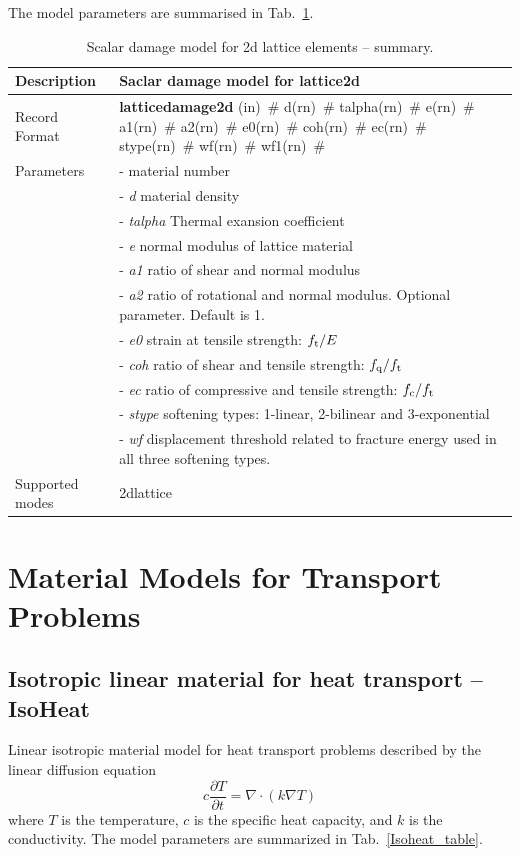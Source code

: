\documentclass[a4paper]{article}
\newcommand{\descitem}[1]{{\noindent \bf #1}}
\newcommand{\elemparam}[2]{{{#1\tiny (#2)}~\#}}
\newcommand{\param}[1]{{\it #1}}
\begin{document}
The model parameters are summarised in Tab.~\ref{latticedamage2d_table}.
\begin{table}[!htb]
\begin{tabular}{|l|p{9cm}|}
\hline
Description & Saclar damage model for lattice2d \\
\hline
Record Format & \descitem{latticedamage2d} \elemparam{}{in} 
\elemparam{d}{rn} \elemparam{talpha}{rn} \elemparam{e}{rn} \elemparam{a1}{rn} \elemparam{a2}{rn} \elemparam{e0}{rn}  \elemparam{coh}{rn} \elemparam{ec}{rn} \elemparam{stype}{rn} \elemparam{wf}{rn} \elemparam{wf1}{rn} \\
Parameters &- \param{} material number\\
&- \param{d} material density\\
&- \param{talpha} Thermal exansion coefficient\\
&- \param{e} normal modulus of lattice material\\
&- \param{a1} ratio of shear and normal modulus\\
&- \param{a2} ratio of rotational and normal modulus. Optional parameter. Default is 1.\\
&- \param{e0} strain at tensile strength: $f_{\rm t}/E$\\
&- \param{coh} ratio of shear and tensile strength: $f_{\rm q}/f_{\rm t}$\\
&- \param{ec} ratio of compressive and tensile strength: $f_{\rm c}/f_{\rm t}$\\
&- \param{stype} softening types: 1-linear, 2-bilinear and 3-exponential\\
&- \param{wf} displacement threshold related to fracture energy used in all three softening types.\\

Supported modes& 2dlattice\\
\hline
\end{tabular}
\caption{Scalar damage model for 2d lattice elements -- summary.}
\label{latticedamage2d_table}
\end{table}

\clearpage

\section{Material Models for Transport Problems}
\subsection{Isotropic linear material for heat transport -- IsoHeat}
\label{IsoLET}
Linear isotropic material model for heat transport problems described
by the linear diffusion equation
\begin{equation}\label{lindiffheat}
c\frac{\partial T}{\partial t} = \nabla \cdot \left( k \nabla T \right)
\end{equation}
where $T$ is the temperature, $c$ is the specific heat capacity,
and $k$ is the conductivity.
The model parameters are summarized
in Tab.~\ref{Isoheat_table}.
\end{document}
